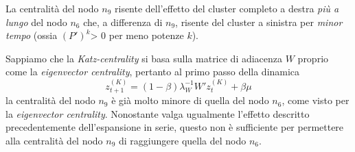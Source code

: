 \begin{alphaparts}
    La centralità del nodo \(n_9\) risente dell'effetto del cluster completo a destra \textit{più a lungo} del nodo \(n_6\) che, a differenza di \(n_9\), risente del cluster a sinistra per \textit{minor tempo} (ossia \((P')^k\)> 0 per meno potenze \(k\)).

    
    Sappiamo che la \textit{Katz-centrality} si basa sulla matrice di adiacenza \(W\) proprio come la \textit{eigenvector centrality}, pertanto al primo passo della dinamica
     \[z^{(K)}_{t+ 1} = (1-\beta)\lambda_W^{-1}W' z^{(K)}_t+ \beta \mu\]
     la centralità del nodo \(n_9\) è già molto minore di quella del nodo \(n_6\), come visto per la \textit{eigenvector centrality}. Nonostante valga ugualmente l'effetto descritto precedentemente dell'espansione in serie, questo non è sufficiente per permettere alla centralità del nodo \(n_9\) di raggiungere quella del nodo \(n_6\).
\end{alphaparts}